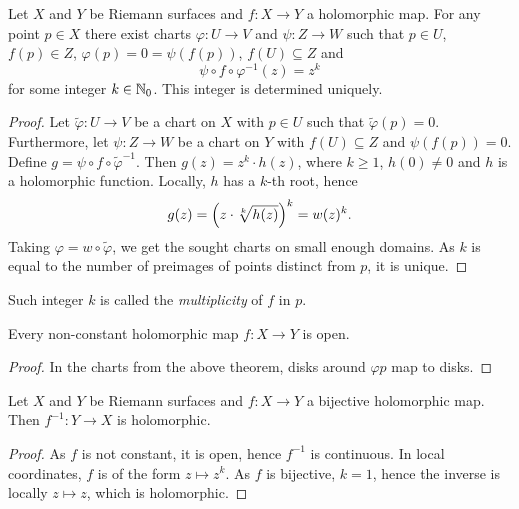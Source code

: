 \begin{izrek}
Let $X$ and $Y$ be Riemann surfaces and $f \colon X \to Y$ a
holomorphic map. For any point $p \in X$ there exist charts
$\varphi \colon U \to V$ and $\psi \colon Z \to W$ such that
$p \in U$, $f(p) \in Z$, $\varphi(p) = 0 = \psi(f(p))$,
$f(U) \subseteq Z$ and
\[
\psi \circ f \circ \varphi^{-1}(z) = z^k
\]
for some integer $k \in \mathbb{N}_0$. This integer is determined uniquely.
\end{izrek}

\begin{proof}
Let $\tilde{\varphi} \colon U \to V$ be a chart on $X$ with
$p \in U$ such that $\tilde{\varphi}(p) = 0$. Furthermore, let
$\psi \colon Z \to W$ be a chart on $Y$ with $f(U) \subseteq Z$ and
$\psi(f(p)) = 0$. Define
$g = \psi \circ f \circ \tilde{\varphi}^{-1}$. Then
$g(z) = z^k \cdot h(z)$, where $k \geq 1$, $h(0) \ne 0$ and $h$ is
a holomorphic function. Locally, $h$ has a $k$-th root, hence
\[
g(z) = \left(z \cdot \sqrt[k]{h(z)}\right)^k = w(z)^k.
\]
Taking $\varphi = w \circ \tilde{\varphi}$, we get the sought
charts on small enough domains. As $k$ is equal to the number of
preimages of points distinct from $p$, it is unique.
\end{proof}

\begin{definicija}
Such integer $k$ is called the
\emph{multiplicity} of $f$ in $p$.
\end{definicija}

\begin{posledica}
Every non-constant holomorphic map $f \colon X \to Y$ is open.
\end{posledica}

\begin{proof}
In the charts from the above theorem, disks around $\varphi{p}$ map
to disks.
\end{proof}

\begin{posledica}
Let $X$ and $Y$ be Riemann surfaces and $f \colon X \to Y$ a
bijective holomorphic map. Then $f^{-1} \colon Y \to X$ is
holomorphic.
\end{posledica}

\begin{proof}
As $f$ is not constant, it is open, hence $f^{-1}$ is continuous.
In local coordinates, $f$ is of the form $z \mapsto z^k$. As $f$ is
bijective, $k=1$, hence the inverse is locally $z \mapsto z$, which
is holomorphic.
\end{proof}

